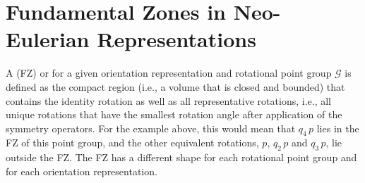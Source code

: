 \section{Fundamental Zones in Neo-Eulerian Representations}\label{\chabbr:sec:FZs}
A  (FZ) or  for a given orientation representation and rotational point group $\mathcal{G}$ is defined as the compact region (i.e., a volume that is closed and bounded)  that contains the identity rotation as well as all representative rotations, i.e., all unique rotations that have the smallest rotation angle after application of the symmetry operators.  For the  example above, this would mean that $q_4\, p$ lies in the FZ of this point group, and the other equivalent rotations, $p$, $q_2\,p$ and $q_3\,p$, lie outside the FZ.  The FZ has a different shape for each rotational point group and for each orientation representation.  

